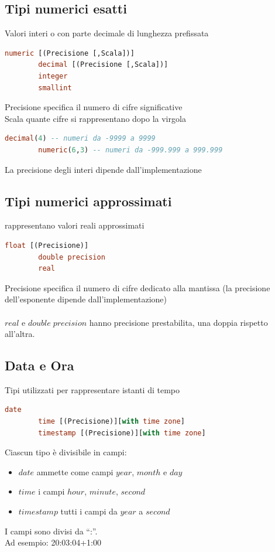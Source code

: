 \documentclass{article}
\begin{document}
	\subsection{Tipi numerici esatti}
	Valori interi o con parte decimale di lunghezza prefissata
	\begin{lstlisting}[language=SQL]
		numeric [(Precisione [,Scala])]
		decimal [(Precisione [,Scala])]
		integer
		smallint
	\end{lstlisting}
	Precisione specifica il numero di cifre significative\\
	Scala quante cifre si rappresentano dopo la virgola
	\begin{lstlisting}[language=SQL]
		decimal(4) -- numeri da -9999 a 9999
		numeric(6,3) -- numeri da -999.999 a 999.999
	\end{lstlisting}
	La precisione degli interi dipende dall'implementazione
	\subsection{Tipi numerici approssimati}
	rappresentano valori reali approssimati
	\begin{lstlisting}[language=SQL]
		float [(Precisione)]
		double precision
		real
	\end{lstlisting}
	Precisione specifica il numero di cifre dedicato alla mantissa (la precisione dell’esponente dipende dall’implementazione)\\\\
	$real$ e $double \; precision$ hanno precisione prestabilita, una doppia rispetto all'altra.
	\subsection{Data e Ora}
	Tipi utilizzati per rappresentare istanti di tempo 
	\begin{lstlisting}[language=SQL]
		date
		time [(Precisione)][with time zone]
		timestamp [(Precisione)][with time zone]
	\end{lstlisting}
	Ciascun tipo è divisibile in campi:\\
	\begin{itemize}
		\item $date$ ammette come campi $year$, $month$ e $day$\\
		\item $time$ i campi $hour$, $minute$, $second$
		\item $timestamp$ tutti i campi da $year$ a $second$
	\end{itemize}
	I campi sono divisi da “:”.\\
	Ad esempio: 20:03:04+1:00
\end{document}
